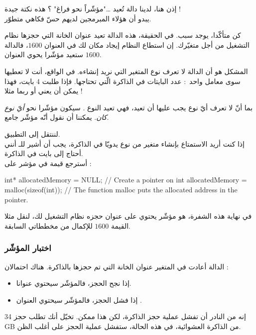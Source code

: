 إذن هنا، لدينا دالة تُعيد \dots "مؤشّراً نحو فراغ" ؟ هذه نكتة جيدة !\\
يبدو أن هؤلاء المبرمجين لديهم حسّ فكاهي متطوّر.

كن متأكّدا، يوجد سبب. في الحقيقة، هذه الدالة تعيد عنوان الخانة التي حجزها نظام التشغيل من أجل متغيّرك. إن استطاع النظام إيجاد مكان لك في العنوان
$1600$،
فالدالة ستعيد مؤشّرا يحوي العنوان
$1600$.

المشكل هو أن الدالة
لا تعرف نوع المتغير التي نريد إنشاءه. في الواقع، أنت لا تعطيها سوى معامل واحد~: عدد البايتات في الذاكرة الّتي تحتاجها. فإذا طلبت 4 بايت، فهذا يمكن أن يعني
أو ربما
مثلا !

بما أنّ
لا تعرف أيّ نوع يجب عليها أن تعيد، فهي تعيد النوع
.
سيكون مؤشّرا نحو
\textit{أيّ نوع كان}.
يمكننا أن نقول أنّه مؤشّر جامع.

لننتقل إلى التطبيق.\\
إذا كنت أريد الاستمتاع بإنشاء متغير من نوع
يدويّا في الذاكرة، يجب أن أشير للـ
أنني أحتاج إلى
بايت في الذاكرة.\\
أسترجع قيمة
في مؤشر على
 :

\begin{Csource}
int* allocatedMemory = NULL; // Create a pointer on int
allocatedMemory = malloc(sizeof(int)); // The function malloc puts the allocated address in the pointer.
\end{Csource}

في نهاية هذه الشفرة،
هو مؤشّر يحتوي على عنوان حجزه نظام التشغيل لك، لنقل مثلا القيمة
$1600$
للإكمال من مخططاتي السابقة.

\subsubsection{اختبار المؤشّر}
الدالة
أعادت في المتغير
عنوان الخانة التي تم حجزها بالذاكرة. هناك احتمالان :
\begin{itemize}
  \item إذا نجح الحجز، فالمؤشّر سيحتوي عنوانا.
  \item إذا فشل الحجز، فالمؤشّر سيحتوي العنوان
.
\end{itemize}

إنه من النادر أن تفشل عملية حجز الذاكرة، لكن هذا ممكن. تخيّل أنك تطلب حجز
\textenglish{34 GB}
من الذاكرة العشوائية، في هذه الحالة، ستفشل عملية الحجز على أغلب الظن.

